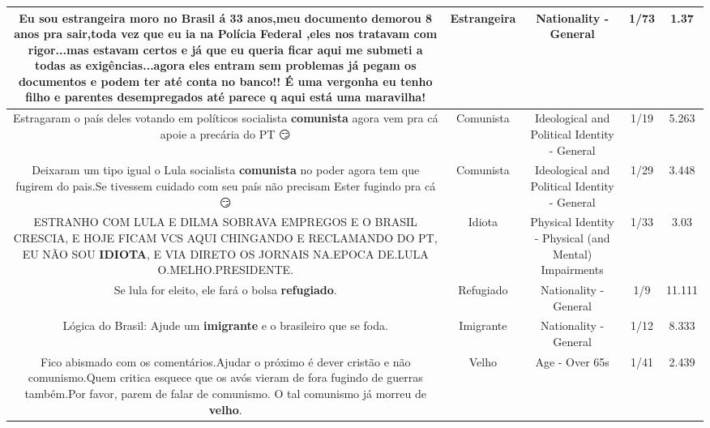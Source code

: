 \documentclass[11pt]{article}
\newlength\mylength
\begin{document}
\begin{center}
\begin{longtable}{|C{.65\mylength}|C{.30\mylength}|C{.12\mylength}|C{.12\mylength}|C{.12\mylength}|}
  \small Eu sou \textbf{estrangeira} moro no Brasil á 33 anos,meu documento demorou 8 anos pra sair,toda vez que eu ia na Polícia Federal ,eles nos tratavam com rigor...mas estavam certos e já que eu queria ficar aqui me submeti a todas as exigências...agora eles entram sem problemas já pegam os documentos e podem ter até conta no banco!! É uma vergonha eu tenho filho e parentes desempregados até parece q aqui está uma maravilha!\normalsize   & Estrangeira & Nationality - General & 1/73 & 1.37 \\  \hline
  \small Estragaram o país deles votando em políticos socialista \textbf{comunista} agora vem pra cá apoie a precária do PT 😏\normalsize   & Comunista & Ideological and Political Identity - General & 1/19 & 5.263 \\  \hline
  \small Deixaram um tipo igual o Lula socialista \textbf{comunista} no poder agora tem que fugirem do pais.Se tivessem cuidado com seu país não precisam Ester fugindo pra cá 😏\normalsize   & Comunista & Ideological and Political Identity - General & 1/29 & 3.448 \\  \hline
  \small ESTRANHO COM LULA E DILMA SOBRAVA EMPREGOS E O BRASIL CRESCIA,  E HOJE FICAM VCS AQUI CHINGANDO E RECLAMANDO DO PT, EU NÃO SOU \textbf{IDIOTA}, E VIA DIRETO OS JORNAIS NA.EPOCA DE.LULA O.MELHO.PRESIDENTE.\normalsize   & Idiota & Physical Identity - Physical (and Mental) Impairments & 1/33 & 3.03 \\  \hline
  \small Se lula for eleito, ele fará o bolsa \textbf{refugiado}.\normalsize   & Refugiado & Nationality - General & 1/9 & 11.111 \\  \hline
  \small Lógica do Brasil: Ajude um \textbf{imigrante} e o brasileiro que se foda.\normalsize   & Imigrante & Nationality - General & 1/12 & 8.333 \\  \hline
  \small Fico abismado com os comentários.Ajudar o próximo é dever cristão e não comunismo.Quem critica esquece que os avós vieram de fora fugindo de guerras também.Por favor, parem de falar de comunismo. O tal comunismo já morreu de \textbf{velho}.\normalsize   & Velho & Age - Over 65s & 1/41 & 2.439 \\  \hline

\end{longtable}
\end{center}
\end{document}
